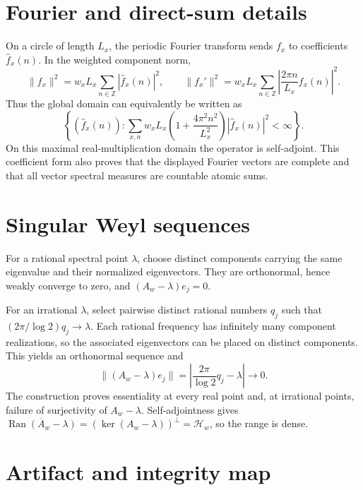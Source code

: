 \documentclass[11pt]{article}
\theoremstyle{definition}
\theoremstyle{remark}
\newcommand{\Z}{\mathbb{Z}}
\newcommand{\Hh}{\mathcal{H}}
\newcommand{\Ran}{\operatorname{Ran}}
\begin{document}
\appendix

\section{Fourier and direct-sum details}

On a circle of length \(L_x\), the periodic Fourier transform sends
\(f_x\) to coefficients \(\widehat f_x(n)\).  In the weighted component
norm,
\[
 \|f_x\|^2=w_xL_x\sum_{n\in\Z}|\widehat f_x(n)|^2,
 \qquad
 \|f_x'\|^2=w_xL_x\sum_{n\in\Z}
 \left|\frac{2\pi n}{L_x}\widehat f_x(n)\right|^2.
\]
Thus the global domain can equivalently be written as
\[
 \left\{(\widehat f_x(n)):
 \sum_{x,n}w_xL_x
 \left(1+\frac{4\pi^2n^2}{L_x^2}\right)
 |\widehat f_x(n)|^2<\infty\right\}.
\]
On this maximal real-multiplication domain the operator is self-adjoint.  This
coefficient form also proves that the displayed Fourier vectors are complete
and that all vector spectral measures are countable atomic sums.

\section{Singular Weyl sequences}

For a rational spectral point \(\lambda\), choose distinct components
carrying the same eigenvalue and their normalized eigenvectors.  They are
orthonormal, hence weakly converge to zero, and
\((A_w-\lambda)e_j=0\).

For an irrational \(\lambda\), select pairwise distinct rational numbers
\(q_j\) such that
\((2\pi/\log2)q_j\to\lambda\).  Each rational frequency has infinitely many
component realizations, so the associated eigenvectors can be placed on
distinct components.  This yields an orthonormal sequence and
\[
 \|(A_w-\lambda)e_j\|
 =\left|\frac{2\pi}{\log2}q_j-\lambda\right|\to0.
\]
The construction proves essentiality at every real point and, at irrational
points, failure of surjectivity of \(A_w-\lambda\).  Self-adjointness gives
\(\overline{\Ran(A_w-\lambda)}=(\ker(A_w-\lambda))^\perp=\Hh_w\), so the
range is dense.

\section{Artifact and integrity map}
\end{document}
